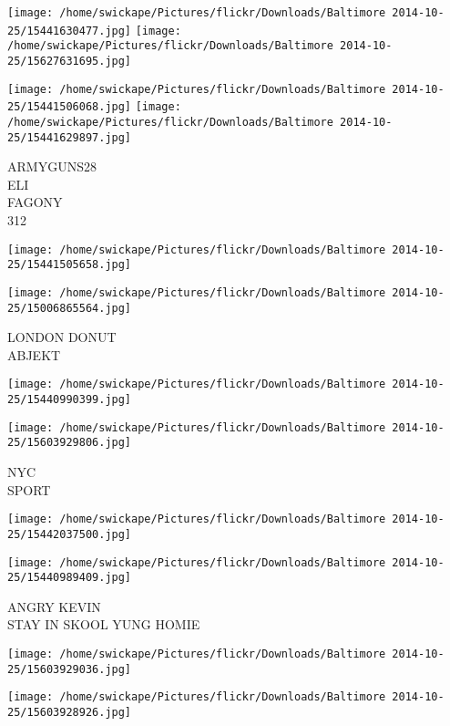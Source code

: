 \documentclass[10pt,letterpaper]{article}
\begin{document}
\texttt{[image: /home/swickape/Pictures/flickr/Downloads/Baltimore 2014-10-25/15441630477.jpg]}
\texttt{[image: /home/swickape/Pictures/flickr/Downloads/Baltimore 2014-10-25/15627631695.jpg]}

\texttt{[image: /home/swickape/Pictures/flickr/Downloads/Baltimore 2014-10-25/15441506068.jpg]}
\texttt{[image: /home/swickape/Pictures/flickr/Downloads/Baltimore 2014-10-25/15441629897.jpg]}

ARMYGUNS28\\
ELI\\
FAGONY\\
312\\
\pagebreak

\texttt{[image: /home/swickape/Pictures/flickr/Downloads/Baltimore 2014-10-25/15441505658.jpg]}

\vspace{0.25in}
\texttt{[image: /home/swickape/Pictures/flickr/Downloads/Baltimore 2014-10-25/15006865564.jpg]}

LONDON DONUT\\
ABJEKT\\
\pagebreak

\texttt{[image: /home/swickape/Pictures/flickr/Downloads/Baltimore 2014-10-25/15440990399.jpg]}

\vspace{0.25in}
\texttt{[image: /home/swickape/Pictures/flickr/Downloads/Baltimore 2014-10-25/15603929806.jpg]}

NYC\\
SPORT\\
\pagebreak

\texttt{[image: /home/swickape/Pictures/flickr/Downloads/Baltimore 2014-10-25/15442037500.jpg]}

\vspace{0.25in}
\texttt{[image: /home/swickape/Pictures/flickr/Downloads/Baltimore 2014-10-25/15440989409.jpg]}

ANGRY KEVIN\\
STAY IN SKOOL YUNG HOMIE\\
\pagebreak

\texttt{[image: /home/swickape/Pictures/flickr/Downloads/Baltimore 2014-10-25/15603929036.jpg]}

\vspace{0.25in}
\texttt{[image: /home/swickape/Pictures/flickr/Downloads/Baltimore 2014-10-25/15603928926.jpg]}
\end{document}

